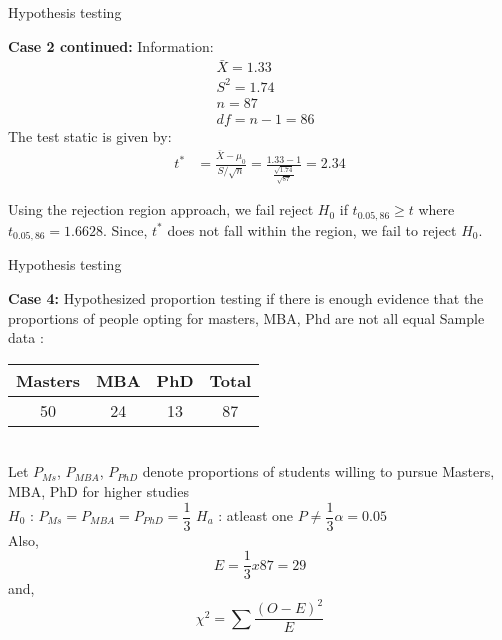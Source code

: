 \documentclass{beamer}
\begin{document}
    \begin{frame}{Hypothesis testing}
        \begin{block}{\textbf{Case 2 continued:}}
            Information:
             \begin{align}
                 &\bar{X}= 1.33\\
                 &S^2 = 1.74\\
                 &n=87\\
                 &df = n-1 = 86
             \end{align}
             The test static is given by:
             \begin{align}
                 t^* &= \frac{\bar{X} - \mu_0}{ S/ \sqrt{n}}
                 = \frac{1.33 - 1}{\frac{\sqrt{1.74}}{\sqrt{87}}}
                 = 2.34
             \end{align}

             Using the rejection region approach, we fail reject $H_0$ if $t_{0.05,86}\geq t$ where $t_{0.05,86} = 1.6628$. Since, $t^*$ does not fall within the region, we fail to reject $H_0$.
        \end{block}
    \end{frame}

    \begin{frame}{Hypothesis testing}
    
  \begin{block}{\textbf{Case 4:} Hypothesized proportion testing if there is enough evidence that the proportions of people opting for masters, MBA, Phd are not all equal}
    Sample data :
    \begin{tabular}{|c|c|c|c|}
        \hline
        Masters & MBA & PhD & Total\\
        \hline
        50 & 24 & 13 & 87 \\
        \hline
    \end{tabular}\\

    Let $P_{Ms}$, $P_{MBA}$, $P_{PhD}$ denote proportions of students willing to pursue Masters, MBA, PhD for higher studies \\

    $H_{0}$ :  $P_{Ms} = P_{MBA} = P_{PhD} = \dfrac{1}{3}$ \space \space \space \space $H_{a}$ : atleast one $P \neq \dfrac{1}{3}$\space \space \space \space $\alpha =0.05$\\

    Also,
    \begin{equation}
        E = \dfrac{1}{3} x 87 = 29
    \end{equation}
    and,
    \begin{equation}
        \chi^{2} = \sum\dfrac{(O - E)^{2}}{E}
    \end{equation}  
    \end{block}
\end{frame}
\end{document}
